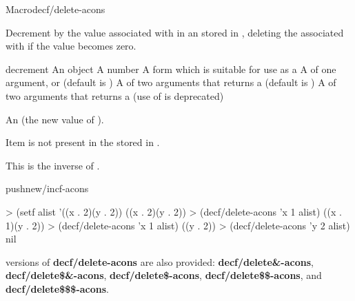 \documentclass[10pt,twoside,english,pdftex]{article}
\begin{document}

\begin{functiondoc}{Macro}{decf/delete-acons}{
     
    \returns{} }
%
%
%
%
  
\fnsyntax

\fnpurpose Decrement by  the value associated with
 in an  stored in , deleting
the  associated with  if the value becomes zero.

\fnpackage {}

\fnmodule {}

\fnargs
\begin{args}{decrement}
\arg[item] An object
\arg[decrement] A number
\arg[place] A form which is suitable for use as a
\arg[key] A  of one argument, or \nil{} (default is \nil)
\arg[test] A  of two arguments that returns a
 (default is ) 
 A  of two arguments that returns a
 (use of  is deprecated)
\end{args}

\fnreturns An  (the new value of ). 

\fnerrors Item  is not present in the 
stored in .

\fndescription
This is the inverse of \textbf{}.

\begin{alsos}{pushnew/incf-acons}
\end{alsos}

\fnexamples
%
\W\supp
\begin{example}
> (setf alist '((x . 2)(y . 2))
((x . 2)(y . 2))
> (decf/delete-acons 'x 1 alist)
((x . 1)(y . 2))
> (decf/delete-acons 'x 1 alist)
((y . 2))\goodpagebreak
> (decf/delete-acons 'y 2 alist)
nil
\end{example}

\fnnote
%
%
%
%
%
%
%
 versions of
\textbf{decf/delete-acons} are also provided: \textbf{decf/delete\&-acons},
\textbf{decf/delete\$\&-acons}, \textbf{decf/delete\$-acons},
\textbf{decf/delete\$\$-acons}, and \textbf{decf/delete\$\$\$-acons}.

\end{functiondoc}
\end{document}
